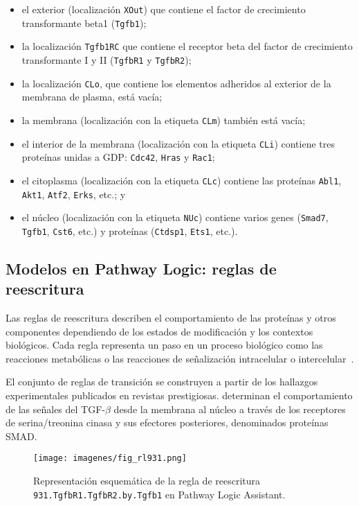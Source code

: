 \begin{itemize}
\item el exterior (localización \texttt{XOut}) que contiene el factor de crecimiento transformante beta1 (\texttt{Tgfb1}); 
\item la localización \texttt{Tgfb1RC} que contiene el receptor beta del factor de crecimiento transformante I y II (\texttt{TgfbR1} y \texttt{TgfbR2}); 
\item la localización \texttt{CLo}, que contiene los elementos adheridos al exterior de la membrana de plasma, está vacía; 
\item la membrana (localización con la etiqueta \texttt{CLm}) también está vacía; 
\item el interior de la membrana (localización con la etiqueta \texttt{CLi}) contiene tres proteínas unidas a GDP: \texttt{Cdc42}, \texttt{Hras} y \texttt{Rac1}; 
\item el citoplasma (localización con la etiqueta \texttt{CLc}) contiene las proteínas \texttt{Abl1}, \texttt{Akt1}, \texttt{Atf2}, \texttt{Erks}, etc.; y 
\item el núcleo (localización con la etiqueta \texttt{NUc}) contiene varios genes (\texttt{Smad7}, \texttt{Tgfb1}, \texttt{Cst6}, etc.) y proteínas (\texttt{Ctdsp1}, \texttt{Ets1}, etc.).
\end{itemize}


\subsection{Modelos en Pathway Logic: reglas de reescritura}

Las reglas de reescritura describen el comportamiento de las proteínas y otros componentes dependiendo de los estados de modificación y los contextos biológicos. Cada regla representa un paso en un proceso biológico como las reacciones metabólicas o las reacciones de señalización intracelular o intercelular~\citep{psb/EkerKLLMS02,DBLP:conf/cmsb/EkerLLST03,DBLP:conf/pacbb/Santos-Buitrago17,DBLP:conf/wsc/Talcott06}. 

El conjunto de reglas de transición se construyen a partir de los hallazgos experimentales publicados en revistas prestigiosas. \citet{nakao1997identification} determinan el comportamiento de las señales del TGF-$\beta$ desde la membrana al núcleo a través de los receptores de serina/treonina cinasa y sus efectores posteriores, denominados proteínas SMAD. 
\medskip

\begin{figure}[h!]
\centering
\texttt{[image: imagenes/fig\_rl931.png]}
\caption[Regla de reescritura \texttt{931} en Pathway Logic Assistant]{Representación esquemática de la regla de reescritura \texttt{931.TgfbR1.TgfbR2.by.Tgfb1} en Pathway Logic Assistant.}
\label{fig:rule931}
\end{figure}


